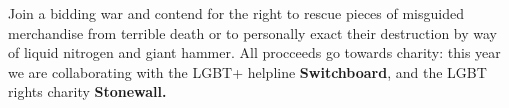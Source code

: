 Join a bidding war and contend for the right to rescue pieces of
misguided merchandise from terrible death \textemdash{} or to
personally exact their destruction by way of liquid nitrogen and giant
hammer. All procceeds go towards charity: this year we are
collaborating with the LGBT+ helpline
\textbf{Switchboard}, and the LGBT rights charity \textbf{Stonewall.}
